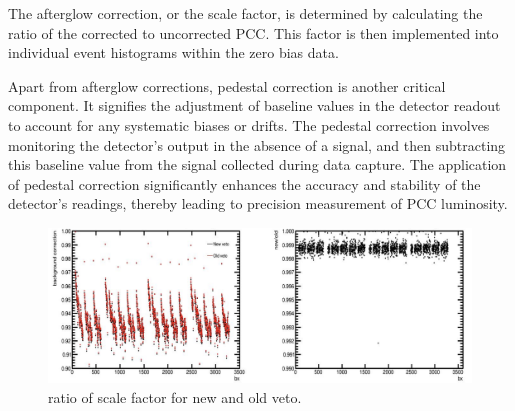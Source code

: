 The afterglow correction, or the scale factor, is determined by calculating the ratio of the corrected to uncorrected PCC. This factor is then implemented into individual event histograms within the zero bias data.

Apart from afterglow corrections, pedestal correction is another critical component. It signifies the adjustment of baseline values in the detector readout to account for any systematic biases or drifts. The pedestal correction involves monitoring the detector's output in the absence of a signal, and then subtracting this baseline value from the signal collected during data capture. The application of pedestal correction significantly enhances the accuracy and stability of the detector's readings, thereby leading to precision measurement of PCC luminosity.



\begin{figure}[!htp]
\centering
\includegraphics[width=1\textwidth]{ashish_thesis/veto_change_same_af.png}
\caption{%
    ratio of scale factor for new and old veto.
}
\label{fig:af_change_veto}
\end{figure}


